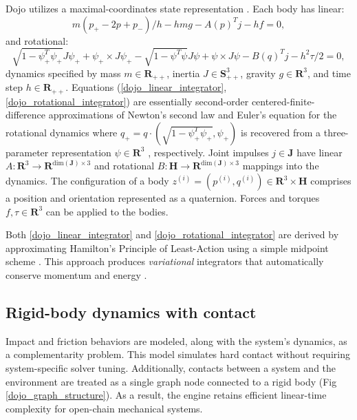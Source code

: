 Dojo utilizes a maximal-coordinates state representation \cite{brudigam2020linear}. Each body has linear:
\begin{equation} 
	m (p_{+} - 2 p + p_{-}) / h - h m g - A(p)^T j - h f = 0, \label{dojo_linear_integrator}
\end{equation}
and rotational: 
\begin{equation}
	\sqrt{1 - \psi_+^T \psi_+} J \psi_+ + \psi_+ \times J \psi_+ - \sqrt{1 - \psi^T \psi} J \psi + \psi \times J \psi - B(q)^T j - h^2 \tau / 2 = 0,
	\label{dojo_rotational_integrator}
\end{equation}
dynamics specified by mass $m \in \mathbf{R}_{++}$, inertia $J \in \mathbf{S}_{++}^3$, gravity $g \in \mathbf{R}^3$, and time step $h \in \mathbf{R}_{++}$. Equations (\ref{dojo_linear_integrator}, \ref{dojo_rotational_integrator}) are essentially second-order centered-finite-difference approximations of Newton's second law and Euler's equation for the rotational dynamics where $q_+ = q \cdot (\sqrt{1 - \psi_+^T \psi_+}, \psi_+)$ is recovered from a three-parameter representation $\psi \in \mathbf{R}^3$ \cite{manchester2016quaternion}, respectively. Joint impulses $j \in \mathbf{J}$ have linear $A : \mathbf{R}^3 \rightarrow \mathbf{R}^{\mbox{dim}(\mathbf{J}) \times 3}$ and rotational $B : \mathbf{H} \rightarrow \mathbf{R}^{\mbox{dim}(\mathbf{J}) \times 3}$ mappings into the dynamics. The configuration of a body $z^{(i)} = (p^{(i)}, q^{(i)}) \in \mathbf{R}^3 \times \mathbf{H}$ comprises a position and orientation represented as a quaternion. Forces and torques $f, \tau \in \mathbf{R}^3$ can be applied to the bodies.

Both \eqref{dojo_linear_integrator} and \eqref{dojo_rotational_integrator} are derived by approximating Hamilton's Principle of Least-Action using a simple midpoint scheme \cite{marsden2001discrete,manchester2020variational}. This approach produces \emph{variational} integrators that automatically conserve momentum and energy \cite{marsden2001discrete}.

\subsection{Rigid-body dynamics with contact}
Impact and friction behaviors are modeled, along with the system's dynamics, as a complementarity problem. This model simulates hard contact without requiring system-specific solver tuning. Additionally, contacts between a system and the environment are treated as a single graph node connected to a rigid body (Fig \ref{dojo_graph_structure}). As a result, the engine retains efficient linear-time complexity for open-chain mechanical systems.

